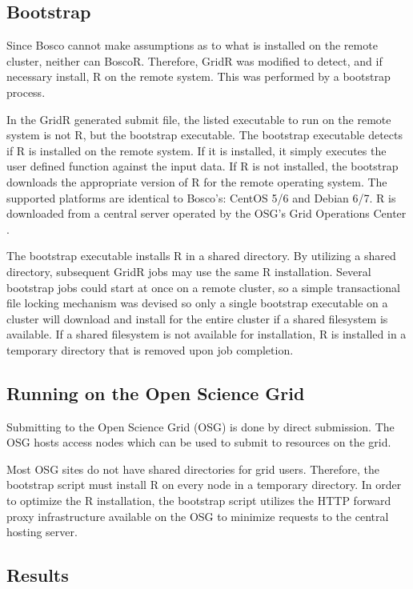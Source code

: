 \subsection{Bootstrap}
\label{sec:boscorbootstrap}

Since Bosco cannot make assumptions as to what is installed on the remote cluster, neither can BoscoR.  Therefore, GridR was modified to detect, and if necessary install, R on the remote system.  This was performed by a bootstrap process.

In the GridR generated submit file, the listed executable to run on the remote system is not R, but the bootstrap executable.  The bootstrap executable detects if R is installed on the remote system.  If it is installed, it simply executes the user defined function against the input data.  If R is not installed, the bootstrap downloads the appropriate version of R for the remote operating system.  The supported platforms are identical to Bosco's: CentOS 5/6 and Debian 6/7.  R is downloaded from a central server operated by the OSG's Grid Operations Center \cite{osgoperations}.  

The bootstrap executable installs R in a shared directory.  By utilizing a shared directory, subsequent GridR jobs may use the same R installation.  Several bootstrap jobs could start at once on a remote cluster, so a simple transactional file locking mechanism was devised so only a single bootstrap executable on a cluster will download and install for the entire cluster if a shared filesystem is available.  If a shared filesystem is not available for installation, R is installed in a temporary directory that is removed upon job completion.

\subsection{Running on the Open Science Grid}

Submitting to the Open Science Grid (OSG) is done by direct submission.  The OSG hosts access nodes which can be used to submit to resources on the grid.

Most OSG sites do not have shared directories for grid users.  Therefore, the bootstrap script must install R on every node in a temporary directory.  In order to optimize the R installation, the bootstrap script utilizes the HTTP forward proxy infrastructure \cite{garzoglio2012supporting} available on the OSG to minimize requests to the central hosting server.


\subsection{Results}
\label{sec:boscorresults}

